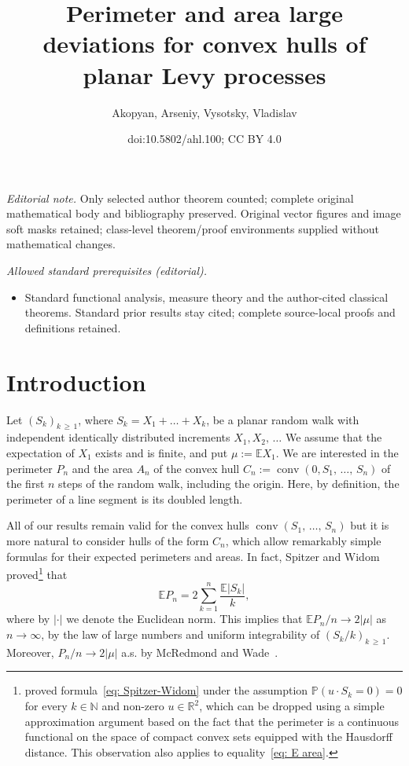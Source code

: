 \documentclass[10pt]{amsart}
\title{Perimeter and area large deviations for convex hulls of planar Levy processes}
\author{Akopyan, Arseniy, Vysotsky, Vladislav}
\date{doi:10.5802/ahl.100; CC BY 4.0}
\theoremstyle{definition}\newtheorem{defi}[theo]{Definition}\newtheorem{rema}[theo]{Remark}\newtheorem{exam}[theo]{Example}\newtheorem{exem}[theo]{Example}\newtheorem{nota}[theo]{Notation}
\DeclareMathOperator{\conv}{conv}
\newcommand{\Rbb}{\mathbb{R}}
\newcommand{\N}{\mathbb{N}}
\newcommand{\E}{\mathbb{E}}
\newcommand{\Pbb}{\mathbb{P}}
\begin{document}
\maketitle
\noindent\textit{Editorial note.} Only selected author theorem counted; complete original mathematical body and bibliography preserved. Original vector figures and image soft masks retained; class-level theorem/proof environments supplied without mathematical changes.\par\medskip
\noindent\textit{Allowed standard prerequisites (editorial).}\begin{itemize}
\item Standard functional analysis, measure theory and the author-cited classical theorems. Standard prior results stay cited; complete source-local proofs and definitions retained.
\end{itemize}\medskip

\section{Introduction} \label{Sec: intro}
Let $(S_k)_{k\,\ge\,1}$, where $S_k = X_1 + \ldots + X_k$, be a planar random walk with independent identically distributed increments $X_1, X_2,\,\ldots$ We assume that the expectation of $X_1$ exists and is finite, and put $\mu := \E X_1$. We are interested in the perimeter $P_n$ and the area $A_n$ of the convex hull $C_n:=\conv(0, S_1,\,\dots,\,S_n)$ of the first $n$ steps of the random walk, including the origin. Here, by definition, the perimeter of a line segment is its doubled length.

All of our results remain valid for the convex hulls $\conv(S_1,\,\dots,\,S_n)$ but it is more natural to consider hulls of the form $C_n$, which allow remarkably simple formulas for their expected perimeters and areas. In fact, Spitzer and Widom~\cite{SpitzerWidom} proved\footnote{\cite{SpitzerWidom} proved formula~\eqref{eq: Spitzer-Widom} under the assumption $\Pbb(u \cdot S_k=0)=0$ for every $k \in \N$ and non-zero $u \in \Rbb^2$, which can be dropped using a simple approximation argument based on the fact that the perimeter is a continuous functional on the space of compact convex sets equipped with the Hausdorff distance. This observation also applies to equality~\eqref{eq: E area}.} that
\begin{equation}\label{eq: Spitzer-Widom}
\E P_n = 2 \sum_{k=1}^n \frac{\E |S_k|}{k},
\end{equation}
where by $|\cdot|$ we denote the Euclidean norm. This implies that $\E P_n/n \to 2 |\mu|$ as $n \to \infty$, by the law of large numbers and uniform integrability of $(S_k/k)_{k\,\ge\,1}$. Moreover, $P_n/n \to 2|\mu|$ a.s. by McRedmond and Wade~\cite{McRedmondWade}.
\end{document}
